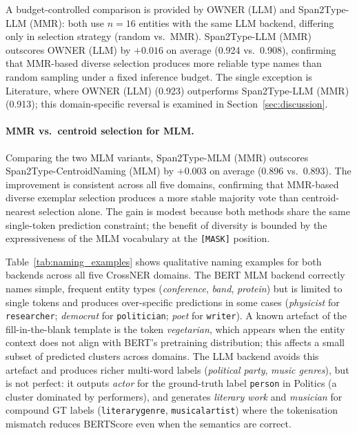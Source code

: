 \documentclass[14pt]{extreport}
\begin{document}
A budget-controlled comparison is provided by OWNER (LLM) and Span2Type-LLM (MMR): both use $n{=}16$ entities with the same LLM backend, differing only in selection strategy (random vs.\ MMR).
Span2Type-LLM (MMR) outscores OWNER (LLM) by $+0.016$ on average (0.924 vs.\ 0.908), confirming that MMR-based diverse selection produces more reliable type names than random sampling under a fixed inference budget.
The single exception is Literature, where OWNER (LLM) (0.923) outperforms Span2Type-LLM (MMR) (0.913); this domain-specific reversal is examined in Section~\ref{sec:discussion}.

\paragraph{MMR vs.\ centroid selection for MLM.}
Comparing the two MLM variants, Span2Type-MLM (MMR) outscores Span2Type-CentroidNaming (MLM) by $+0.003$ on average (0.896 vs.\ 0.893).
The improvement is consistent across all five domains, confirming that MMR-based diverse exemplar selection produces a more stable majority vote than centroid-nearest selection alone.
The gain is modest because both methods share the same single-token prediction constraint; the benefit of diversity is bounded by the expressiveness of the MLM vocabulary at the \texttt{[MASK]} position.

Table~\ref{tab:naming_examples} shows qualitative naming examples for both backends across all five CrossNER domains.
The BERT MLM backend correctly names simple, frequent entity types (\textit{conference}, \textit{band}, \textit{protein}) but is limited to single tokens and produces over-specific predictions in some cases (\textit{physicist} for \texttt{researcher}; \textit{democrat} for \texttt{politician}; \textit{poet} for \texttt{writer}).
A known artefact of the fill-in-the-blank template is the token \textit{vegetarian}, which appears when the entity context does not align with BERT's pretraining distribution; this affects a small subset of predicted clusters across domains.
The LLM backend avoids this artefact and produces richer multi-word labels (\textit{political party}, \textit{music genres}), but is not perfect: it outputs \textit{actor} for the ground-truth label \texttt{person} in Politics (a cluster dominated by performers), and generates \textit{literary work} and \textit{musician} for compound GT labels (\texttt{literarygenre}, \texttt{musicalartist}) where the tokenisation mismatch reduces BERTScore even when the semantics are correct.
\end{document}
